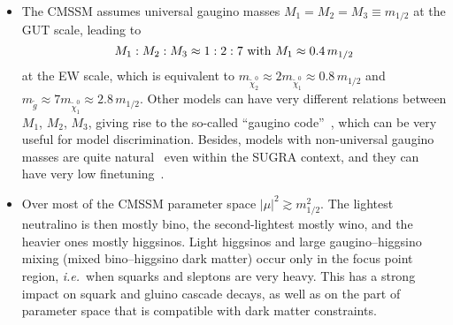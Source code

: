 \begin{itemize}

\item The CMSSM assumes universal gaugino masses $M_1=M_2=M_3\equiv m_{1/2}$ 
at the GUT scale, leading to 
\begin{equation}
  M_1 : M_2 : M_3 \approx 1 : 2 : 7 ~{\rm with}~ M_1 \approx 0.4\,m_{1/2}
  \label{eq:gauginos}
\end{equation}
at the EW scale, which is equivalent to 
$m_{\tilde\chi^0_2}\approx 2m_{\tilde\chi^0_1}\approx 0.8\,m_{1/2}$ 
and $m_{\tilde g}\approx 7m_{\tilde\chi^0_1}\approx 2.8\,m_{1/2}$. 
Other models can have very different relations between 
$M_1$, $M_2$, $M_3$, giving rise to the so-called 
``gaugino code''~\cite{Choi:2007ka}, 
which can be very useful for model discrimination. Besides, models with 
non-universal gaugino masses are quite natural~\cite{Martin:2009ad} even 
within the SUGRA context, and they can have very low finetuning~\cite{Horton:2009ed}.

\item Over most of the CMSSM parameter space $|\mu|^2\gtrsim m_{1/2}^2$. 
The lightest neutralino is then mostly bino, the second-lightest mostly wino, 
and the heavier ones mostly higgsinos. Light higgsinos and large gaugino--higgsino 
mixing (mixed bino--higgsino dark matter) occur only in the focus point region, 
{\it i.e.}\ when squarks and sleptons are very heavy. This has a strong impact on 
squark and gluino cascade decays, as well as on the part of parameter 
space that is compatible with dark matter constraints. 


\end{itemize}
